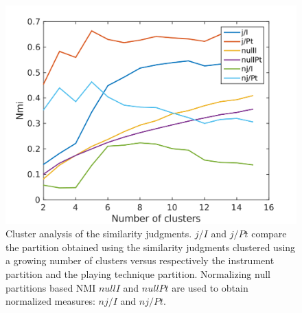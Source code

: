 \documentclass{article}
\begin{document}
\begin{figure}
\center
\includegraphics[width = \textwidth]{figures/clusterAnalysis.png}
\caption{Cluster analysis of the similarity judgments. $j/I$ and $j/Pt$ compare the partition obtained using the similarity judgments clustered using a growing number of clusters versus respectively the instrument partition and the playing technique partition. Normalizing null partitions based NMI $nullI$ and $nullPt$ are used to obtain normalized measures: $nj/I$ and $nj/Pt$.}
\label{fig:clusters}
\end{figure}
\end{document}
